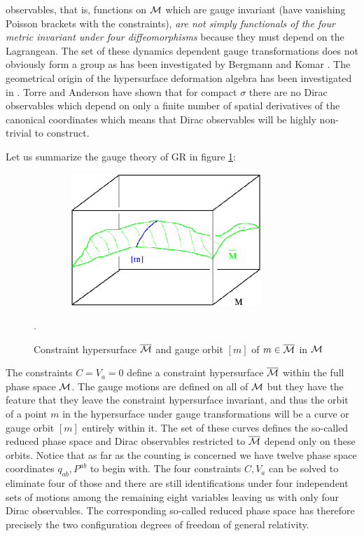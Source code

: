 \documentclass[12pt]{report}
\begin{document}
observables, that 
is, functions on $\cal M$ which are gauge invariant (have vanishing 
Poisson brackets with the constraints), {\it 
are not simply
functionals of the four metric invariant under four diffeomorphisms} because
they must depend on the Lagrangean. The set of 
these dynamics dependent gauge transformations does not obviously form a 
group 
as has been investigated by Bergmann and Komar \cite{19}. The geometrical 
origin of the hypersurface deformation algebra has been investigated in 
\cite{20}. Torre and Anderson have shown that for compact $\sigma$ there 
are no Dirac observables
which depend on only a finite number of spatial derivatives of the canonical
coordinates \cite{21} which means that Dirac observables will be highly
non-trivial to construct. 

Let us summarize the gauge theory of GR in figure \ref{f6}:
%
\begin{figure} 
\includegraphics[width=10cm,height=5cm]{proc9fig6.ps}
\caption{Constraint hypersurface $\overline{{\cal M}}$ and gauge orbit 
$[m]$ of $m\in \overline{{\cal M}}$ in $\cal M$}. 
\label{f6}
\end{figure}
%
The constraints $C=V_a=0$ define a constraint hypersurface 
$\overline{{\cal M}}$ within the 
full phase space $\cal M$. The gauge motions are defined on all of 
$\cal M$ but they have the feature that they leave the constraint 
hypersurface invariant, and thus the orbit of a point $m$ in the 
hypersurface under gauge transformations will be a curve or gauge 
orbit $[m]$ entirely 
within it. The set of these curves defines the so-called reduced phase 
space  and Dirac observables restricted to $\overline{{\cal M}}$ depend 
only on these orbits.
Notice that as far as the counting is concerned we have twelve phase 
space coordinates $q_{ab},P^{ab}$ to begin with. The four constraints 
$C,V_a$ can be solved to eliminate four of those and there are still
identifications under four independent sets of motions among the remaining
eight variables leaving us with only four Dirac observables. The 
corresponding so-called reduced phase space has therefore precisely the two
configuration degrees of freedom of general relativity.
\end{document}
